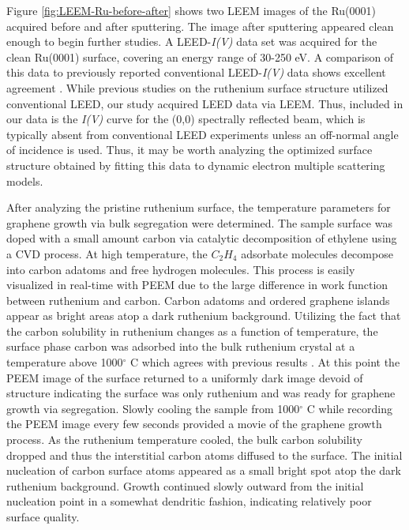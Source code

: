 Figure \ref{fig:LEEM-Ru-before-after} shows two LEEM images of the Ru(0001) acquired before and after sputtering. The image after sputtering appeared clean enough to begin further studies. A LEED-\textit{I(V)} data set was acquired for the clean Ru(0001) surface, covering an energy range of 30-250 eV. A comparison of this data to previously reported conventional LEED-\textit{I(V)} data shows excellent agreement \cite{Ru-LEED-old}. While previous studies on the ruthenium surface structure utilized conventional LEED, our study acquired LEED data via LEEM. Thus, included in our data is the \textit{I(V)} curve for the (0,0) spectrally reflected beam, which is typically absent from conventional LEED experiments unless an off-normal angle of incidence is used. Thus, it may be worth analyzing the optimized surface structure obtained by fitting this data to dynamic electron multiple scattering models.

After analyzing the pristine ruthenium surface, the temperature parameters for graphene growth via bulk segregation were determined. The sample surface was doped with a small amount carbon via catalytic decomposition of ethylene using a CVD process. At high temperature, the $C_{2}H_{4}$ adsorbate molecules decompose into carbon adatoms and free hydrogen molecules. This process is easily visualized in real-time with PEEM due to the large difference in work function between ruthenium and carbon. Carbon adatoms and ordered graphene islands appear as bright areas atop a dark ruthenium background. Utilizing the fact that the carbon solubility in ruthenium changes as a function of temperature, the surface phase carbon was adsorbed into the bulk ruthenium crystal at a temperature above 1000$^\circ$ C which agrees with previous results \cite{mccarty-carbon}. At this point the PEEM image of the surface returned to a uniformly dark image devoid of structure indicating the surface was only ruthenium and was ready for graphene growth via segregation. Slowly cooling the sample from 1000$^\circ$ C while recording the PEEM image every few seconds provided a movie of the graphene growth process. As the ruthenium temperature cooled, the bulk carbon solubility dropped and thus the interstitial carbon atoms diffused to the surface. The initial nucleation of carbon surface atoms appeared as a small bright spot atop the dark ruthenium background. Growth continued slowly outward from the initial nucleation point in a somewhat dendritic fashion, indicating relatively poor surface quality.

